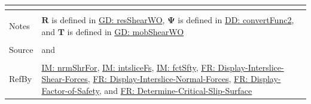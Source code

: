 \documentclass[12pt]{article}
\begin{document}
\begin{minipage}{\textwidth}
\begin{tabular}{>{\raggedright}p{}>{\raggedright\arraybackslash}p{}}
\begin{symbDescription}
              \end{symbDescription}
\\ \midrule \\
Notes & $\mathbf{R}$ is defined in \hyperref[GD:resShearWO]{GD: resShearWO}, $\mathbf{Ψ}$ is defined in \hyperref[DD:convertFunc2]{DD: convertFunc2}, and $\mathbf{T}$ is defined in \hyperref[GD:mobShearWO]{GD: mobShearWO}
\\ \midrule \\
Source & \cite{chen2005} and \cite{karchewski2012}
\\ \midrule \\
RefBy & \hyperref[IM:nrmShrFor]{IM: nrmShrFor}, \hyperref[IM:intsliceFs]{IM: intsliceFs}, \hyperref[IM:fctSfty]{IM: fctSfty}, \hyperref[displayShear]{FR: Display-Interslice-Shear-Forces}, \hyperref[displayNormal]{FR: Display-Interslice-Normal-Forces}, \hyperref[displayFS]{FR: Display-Factor-of-Safety}, and \hyperref[determineCritSlip]{FR: Determine-Critical-Slip-Surface}
\\ \bottomrule
\end{tabular}
\end{minipage}
\end{document}
